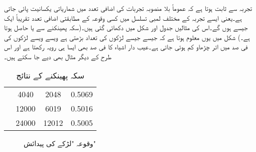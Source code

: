تجربہ سے ثابت ہوتا ہے کہ عموماً بلا منصوبہ تجربات کی اضافی تعدد میں شماریاتی یکسانیت پائی جاتی ہے۔یعنی ایسے تجربہ کے مختلف لمبی تسلسل میں کسی وقوعہ کے مطابقتی اضافی تعدد  تقریباً ایک جیسے ہوں گے۔اس کی مثالیں جدول  اور شکل  میں دکھائی گئی ہیں۔(سکہ پھینکنے سے  یا  حاصل ہوتا ہے۔)  شکل  میں یوں معلوم ہوتا ہے کہ جیسے جیسے لڑکوں کی تعداد بڑھتی ہے ویسے ویسے لڑکوں کی فی صد میں اتر چڑھاو کم ہوتی جاتی ہے۔عیب دار اشیاء کا فی صد بھی  ایسا ہی رویہ رکھتا ہے اور اس طرح کے دیگر مثال بھی دیے جا سکتے ہیں۔   
\begin{table}
\caption{سکہ پھینکنے کے نتائج}
\label{جدول_شماریات_سکہ_پھینکنے_کے_نتائج}
\centering
\begin{otherlanguage}{english}
\begin{tabular}{C|C|C|C}
\hline
{}&&&\\
\hline
{}& \num{4040}&\num{2048}&\num{0.5069}\\
& \num{12000}&\num{6019}&\num{0.5016}\\
& \num{24000}&\num{12012}&\num{0.5005}\\
\hline
\end{tabular}
\end{otherlanguage}
\end{table}
\begin{figure}
\centering
{}
\caption{وقوعہ "لڑکے کی پیدائش"}
\label{شکل_شماریات_وقوعہ_لڑکا}
\end{figure}

